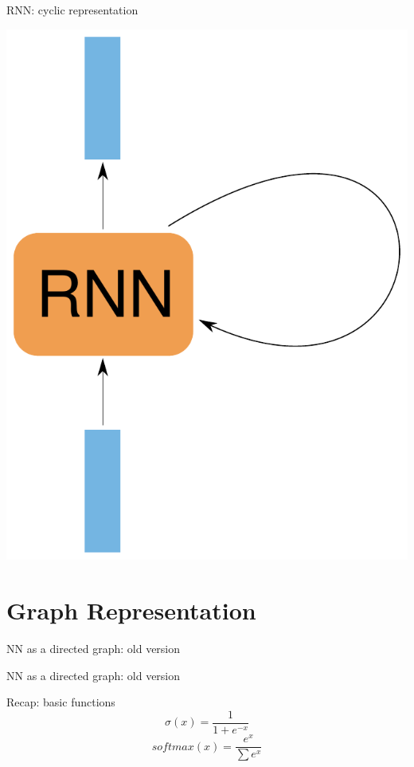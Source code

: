 \documentclass[10pt]{beamer}
\begin{document}
\begin{frame}[fragile]{RNN: cyclic representation}
\begin{center}
\includegraphics[scale=0.5]{images/RNNnaive2.pdf}
\end{center}
\end{frame}


\section{Graph Representation}

\begin{frame}[fragile]{NN as a directed graph: old version}

\end{frame}

\begin{frame}[fragile]{NN as a directed graph: old version}

\end{frame}

\begin{frame}{Recap: basic functions}
\Large{
 \vspace{0.2cm}
\begin{equation*}
\sigma(x) = \frac{1}{1 + e^{-x}}
\end{equation*}
\vspace{0.5cm}
 \begin{equation*}
softmax(x) = \frac{e^{x}}{\sum e^{x}}
\end{equation*}
}
\end{frame}
\end{document}
